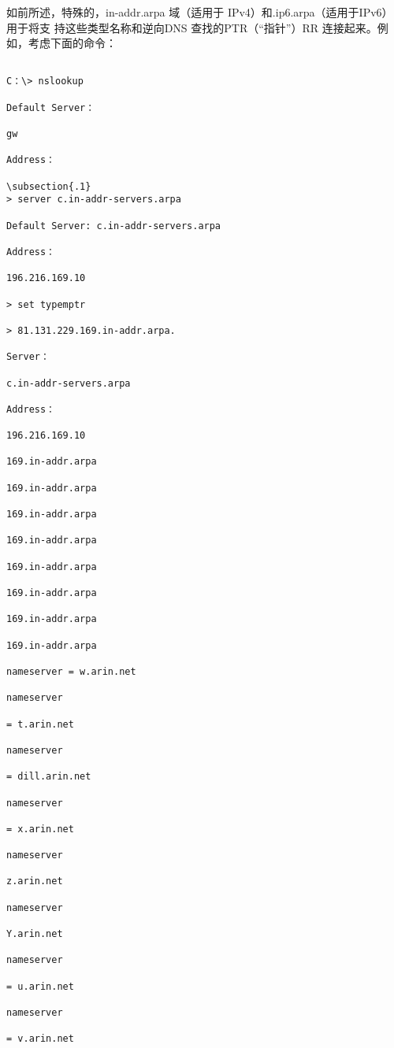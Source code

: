 如前所述，特殊的，in-addr.arpa 域（适用于 IPv4）和.ip6.arpa（适用于IPv6）用于将支
持这些类型名称和逆向DNS 查找的PTR（“指针”）RR 连接起来。例如，考虑下面的命令：

\begin{verbatim}
    
C：\> nslookup

Default Server：

gw

Address：

\subsection{.1}
> server c.in-addr-servers.arpa

Default Server: c.in-addr-servers.arpa

Address：

196.216.169.10

> set typemptr

> 81.131.229.169.in-addr.arpa.

Server：

c.in-addr-servers.arpa

Address：

196.216.169.10

169.in-addr.arpa

169.in-addr.arpa

169.in-addr.arpa

169.in-addr.arpa

169.in-addr.arpa

169.in-addr.arpa

169.in-addr.arpa

169.in-addr.arpa

nameserver = w.arin.net

nameserver

= t.arin.net

nameserver

= dill.arin.net

nameserver

= x.arin.net

nameserver

z.arin.net

nameserver

Y.arin.net

nameserver

= u.arin.net

nameserver

= v.arin.net
\end{verbatim}

